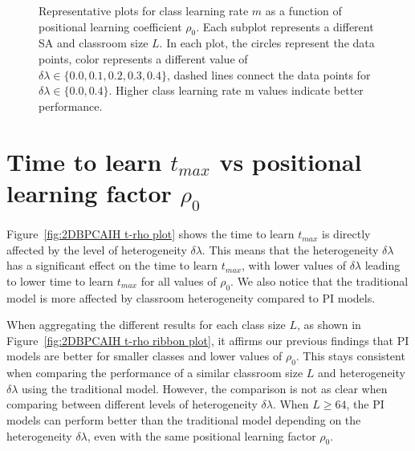 \begin{figure}[htbp!]
   \caption[Positional learning factor $\rho_0$ dependence of class learning rate $m$ for the heterogeneous classroom model]{Representative plots for class learning rate $m$ as a function of positional learning coefficient $\rho_0$.
   Each subplot represents a different SA and classroom size $L$.
   In each plot, the circles represent the data points, color represents a different value of $\delta\lambda \in \lbrace 0.0, 0.1, 0.2, 0.3, 0.4 \rbrace$, dashed lines connect the data points for $\delta\lambda \in \lbrace 0.0, 0.4 \rbrace$.
   Higher class learning rate m values indicate better performance.
   }
   \label{fig:2DBPCAIH m rho plot}
\end{figure}

\newpage %

\section{Time to learn $t_{max}$ vs positional learning factor $\rho_0$}\label{sec:BPCAIH t vs rho}
Figure~\ref{fig:2DBPCAIH t-rho plot} shows the time to learn $t_{max}$ is directly affected by the level of heterogeneity $\delta\lambda$. 
This means that the heterogeneity $\delta\lambda$ has a significant effect on the time to learn $t_{max}$, with lower values of $\delta\lambda$ leading to lower time to learn $t_{max}$ for all values of $\rho_0$. 
We also notice that the traditional model is more affected by classroom heterogeneity compared to PI models.

When aggregating the different results for each class size $L$, as shown in Figure~\ref{fig:2DBPCAIH t-rho ribbon plot}, it affirms our previous findings that PI models are better for smaller classes and lower values of $\rho_0$.
This stays consistent when comparing the performance of a similar classroom size $L$ and heterogeneity $\delta\lambda$ using the traditional model.
However, the comparison is not as clear when comparing between different levels of heterogeneity $\delta\lambda$.
When $L\geq64$, the PI models can perform better than the traditional model depending on the heterogeneity $\delta\lambda$, even with the same positional learning factor $\rho_0$.

